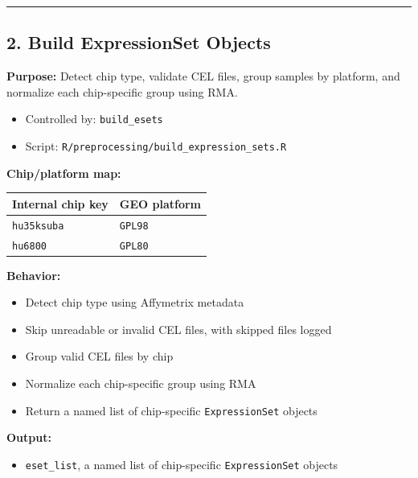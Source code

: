 \documentclass[
  letterpaper,
  DIV=11,
  numbers=noendperiod,
  openany,
  oneside]{scrreprt}
\providecommand{\tightlist}{%
  \setlength{\itemsep}{0pt}\setlength{\parskip}{0pt}}
\begin{document}
\begin{center}\rule{0.5\linewidth}{0.5pt}\end{center}

\subsection*{2. Build ExpressionSet
Objects}\label{build-expressionset-objects}

\textbf{Purpose:} Detect chip type, validate CEL files, group samples by
platform, and normalize each chip-specific group using RMA.

\begin{itemize}
\tightlist
\item
  Controlled by: \texttt{build\_esets}
\item
  Script: \texttt{R/preprocessing/build\_expression\_sets.R}
\end{itemize}

\textbf{Chip/platform map:}

\begin{longtable}[]{@{}ll@{}}
\toprule\noalign{}
Internal chip key & GEO platform \\
\midrule\noalign{}
\endhead
\bottomrule\noalign{}
\endlastfoot
\texttt{hu35ksuba} & \texttt{GPL98} \\
\texttt{hu6800} & \texttt{GPL80} \\
\end{longtable}

\textbf{Behavior:}

\begin{itemize}
\tightlist
\item
  Detect chip type using Affymetrix metadata
\item
  Skip unreadable or invalid CEL files, with skipped files logged
\item
  Group valid CEL files by chip
\item
  Normalize each chip-specific group using RMA
\item
  Return a named list of chip-specific \texttt{ExpressionSet} objects
\end{itemize}

\textbf{Output:}

\begin{itemize}
\tightlist
\item
  \texttt{eset\_list}, a named list of chip-specific
  \texttt{ExpressionSet} objects
\end{itemize}
\end{document}
